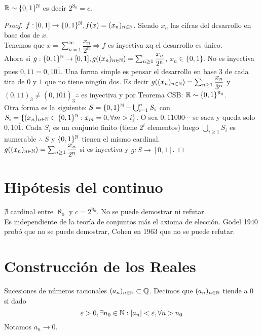\begin{theorem}
  $\mathbb{R} \sim \{ 0, 1 \}^{\mathbb{N}}$ es decir $2^{\aleph_0} = c$.
  \begin{proof}
    $f: [0, 1] \to \{ 0, 1 \}^{\mathbb{N}}, f(x) = (x_n)_{n \in \mathbb{N}}$. Siendo $x_n$ las cifras del desarrollo en base dos de $x$. \\
    Tenemos que $x = \sum_{n=1}^\infty \dfrac{x_n}{2^n} \Rightarrow f$ es inyectiva xq el desarrollo es único. \\
    Ahora si $g: \{ 0, 1 \}^{\mathbb{N}} \to [0, 1], g((x_n)_{n \in \mathbb{N}}) = \sum_{n \geq 1} \dfrac{x_n}{2^n}$, $x_n \in \{0, 1\}$. No es inyectiva pues $0,11 = 0,10\overline{1}$.
    Una forma simple es pensar el desarrollo en base $3$ de cada tira de $0$ y $1$ que no tiene ningún dos. Es decir $g((x_n)_{n \in \mathbb{N}}) = \sum_{n \geq 1} \dfrac{x_n}{3^n}$ y $(0,11)_3 \neq (0,10\overline{1})_3 \therefore$
    es inyectiva y por Teorema CSB: $\mathbb{R} \sim \{0,1\}^{\aleph_0}$. \\
    Otra forma es la siguiente:
    $S = \{0, 1\}^{\mathbb{N}} - \bigcup_{i=1}^n S_i$ con $S_i = \{ (x_n)_{n \in \mathbb{N}} \in \{0, 1\}^{\mathbb{N}} : x_m = 0, \forall m > i \}$. O sea $0,11000\cdots$ se saca y queda solo $0,10\overline{1}$.
    Cada $S_i$ es un conjunto finito (tiene $2^i$ elementos) luego $\bigcup_{i \geq 1} S_i$ es numerable $\therefore$ $S$ y $\{0,1\}^{\mathbb{N}}$ tienen el mismo cardinal. \\
    $g((x_n)_{n \in \mathbb{N}}) = \sum_{n \geq 1} \dfrac{x_n}{2^n}$ si es inyectiva y $g: S \to [0, 1]$.
  \end{proof}
\end{theorem}

\section{Hipótesis del continuo}

$\nexists$ cardinal entre $\aleph_0$ y $c = 2^{\aleph_0}$. No se puede demostrar ni refutar. \\
Es independiente de la teoría de conjuntos más el axioma de elección.
Gödel 1940 probó que no se puede demostrar, Cohen en 1963 que no se puede refutar.

\section{Construcción de los Reales}

Sucesiones de números racionales $(a_n)_{n \in \mathbb{N}} \subset \mathbb{Q}$. Decimos que $(a_n)_{n \in \mathbb{N}}$ tiende a 0 si dado \begin{equation} \varepsilon > 0, \exists n_0 \in \mathbb{N} : |a_n| < \varepsilon, \forall n > n_0 \end{equation} Notamos $a_n \to 0$.

